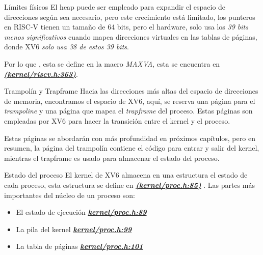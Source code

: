 \documentclass{libs/ufc_format}
\begin{document}
\begin{frame}{Límites físicos}
  El heap puede ser empleado para expandir el espacio de direcciones según sea necesario, pero este crecimiento está limitado, los punteros en RISC-V tienen un tamaño de 64 bits, pero el hardware, solo usa los \emph{39 bits menos significativos} cuando mapea direcciones virtuales en las tablas de páginas, donde XV6 \emph{solo usa 38 de estos 39 bits}.

  \vspace{0.2cm}

  Por lo que , esta se define en la macro \textit{\emph{MAXVA}}, esta se encuentra en \href{https://github.com/CarlosSandoval-03/xv6-riscv/blob/riscv/kernel/riscv.h\#L363}{\textit{\textbf{(kernel/riscv.h:363)}}}. \cite{xv6}
\end{frame}
\begin{frame}{Trampolín y Trapframe}
  Hacia las direcciones más altas del espacio de direcciones de memoria, encontramos el espacio de XV6, aquí, se reserva una página para el \textit{\emph{trampoline}} y una página que mapea el \textit{\emph{trapframe}} del proceso. Estas páginas son empleadas por XV6 para hacer la transición entre el kernel y el proceso.

  \vspace{0.3cm}

  Estas páginas se abordarán con más profundidad en próximos capítulos, pero en resumen, la página del trampolín contiene el código para entrar y salir del kernel, mientras el trapframe es usado para almacenar el estado del proceso. \cite{stackoverflow:Trapframe}
\end{frame}
\begin{frame}{Estado del proceso}
  El kernel de XV6 almacena en una estructura el estado de cada proceso, esta estructura se define en \href{https://github.com/CarlosSandoval-03/xv6-riscv/blob/riscv/kernel/proc.h\#L85}{\textit{\textbf{(kernel/proc.h:85)}}} \cite{xv6}. Las partes más importantes del núcleo de un proceso son:

  \begin{itemize}
    \item El estado de ejecución \href{https://github.com/CarlosSandoval-03/xv6-riscv/blob/riscv/kernel/proc.h\#L89}{\textit{\textbf{kernel/proc.h:89}}}
    \item La pila del kernel \href{https://github.com/CarlosSandoval-03/xv6-riscv/blob/riscv/kernel/proc.h\#L99}{\textit{\textbf{kernel/proc.h:99}}}
    \item La tabla de páginas \href{https://github.com/CarlosSandoval-03/xv6-riscv/blob/riscv/kernel/proc.h\#L101}{\textit{\textbf{kernel/proc.h:101}}}
  \end{itemize}
\end{frame}
\end{document}
